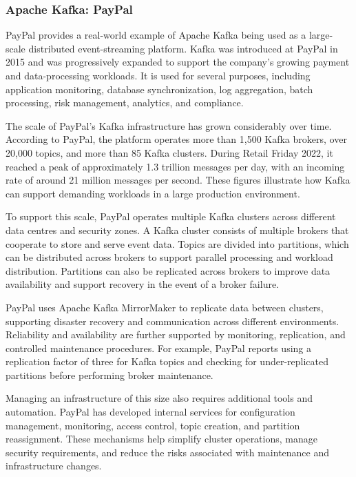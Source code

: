 \documentclass{scrartcl}
\begin{document}
\subsubsection{Apache Kafka: PayPal}

PayPal provides a real-world example of Apache Kafka being used as a large-scale distributed event-streaming platform. Kafka was introduced at PayPal in 2015 and was progressively expanded to support the company's growing payment and data-processing workloads. It is used for several purposes, including application monitoring, database synchronization, log aggregation, batch processing, risk management, analytics, and compliance.

The scale of PayPal's Kafka infrastructure has grown considerably over time. According to PayPal, the platform operates more than 1,500 Kafka brokers, over 20,000 topics, and more than 85 Kafka clusters. During Retail Friday 2022, it reached a peak of approximately 1.3 trillion messages per day, with an incoming rate of around 21 million messages per second. These figures illustrate how Kafka can support demanding workloads in a large production environment.

To support this scale, PayPal operates multiple Kafka clusters across different data centres and security zones. A Kafka cluster consists of multiple brokers that cooperate to store and serve event data. Topics are divided into partitions, which can be distributed across brokers to support parallel processing and workload distribution. Partitions can also be replicated across brokers to improve data availability and support recovery in the event of a broker failure.

PayPal uses Apache Kafka MirrorMaker to replicate data between clusters, supporting disaster recovery and communication across different environments. Reliability and availability are further supported by monitoring, replication, and controlled maintenance procedures. For example, PayPal reports using a replication factor of three for Kafka topics and checking for under-replicated partitions before performing broker maintenance.

Managing an infrastructure of this size also requires additional tools and automation. PayPal has developed internal services for configuration management, monitoring, access control, topic creation, and partition reassignment. These mechanisms help simplify cluster operations, manage security requirements, and reduce the risks associated with maintenance and infrastructure changes.
\end{document}
